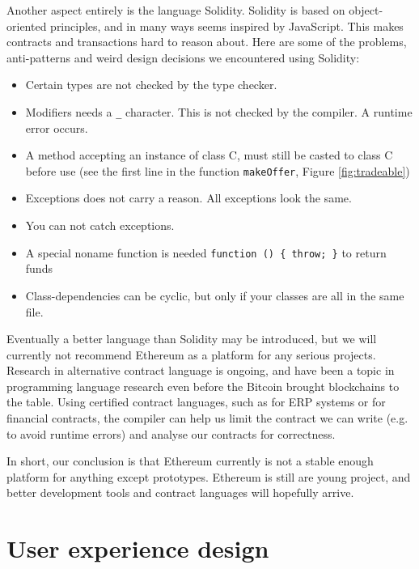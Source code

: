 \documentclass[oneside,a4paper,10pts,article]{memoir}
\begin{document}
Another aspect entirely is the language Solidity. Solidity is based on
object-oriented principles, and in many ways seems inspired by
JavaScript. This makes contracts and transactions hard to reason
about. Here are some of the problems, anti-patterns and weird design
decisions we encountered using Solidity:
\begin{itemize}
\item Certain types are not checked by the type checker. 
\item Modifiers needs a \texttt{\_} character. This is not checked by
  the compiler. A runtime error occurs.
\item A method accepting an instance of class C, must still be casted
  to class C before use (see the first line in the function
  \texttt{makeOffer}, Figure \ref{fig:tradeable})
\item Exceptions does not carry a reason. All exceptions look the same.
\item You can not catch exceptions.
\item A special noname function is needed \texttt{function () \{ throw; \}} to return funds
\item Class-dependencies can be cyclic, but only if your classes are
  all in the same file.
\end{itemize}

Eventually a better language than Solidity may be introduced, but we
will currently not recommend Ethereum as a platform for any serious
projects. Research in alternative contract language is ongoing, and
have been a topic in programming language research even before the
Bitcoin brought blockchains to the table. Using certified contract
languages, such as \cite{hvitved2011contract} for ERP systems or
\cite{bahr2015certified} for financial contracts, the compiler can
help us limit the contract we can write (e.g. to avoid runtime errors)
and analyse our contracts for correctness.

In short, our conclusion is that Ethereum currently is not a stable
enough platform for anything except prototypes. Ethereum is still are
young project, and better development tools and contract languages
will hopefully arrive.

\chapter{User experience design}
\end{document}
